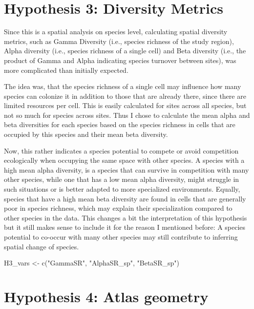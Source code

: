 \documentclass[
  letterpaper,
  DIV=11,
  numbers=noendperiod]{scrreprt}
\newenvironment{Shaded}{\begin{snugshade}}{\end{snugshade}}
\newcommand{\FunctionTok}[1]{\textcolor[rgb]{0.28,0.35,0.67}{#1}}
\newcommand{\NormalTok}[1]{\textcolor[rgb]{0.00,0.23,0.31}{#1}}
\newcommand{\OtherTok}[1]{\textcolor[rgb]{0.00,0.23,0.31}{#1}}
\newcommand{\StringTok}[1]{\textcolor[rgb]{0.13,0.47,0.30}{#1}}
\begin{document}
\section{Hypothesis 3: Diversity Metrics}

Since this is a spatial analysis on species level, calculating spatial
diversity metrics, such as Gamma Diversity (i.e., species richness of
the study region), Alpha diversity (i.e., species richness of a single
cell) and Beta diversity (i.e., the product of Gamma and Alpha
indicating species turnover between sites), was more complicated than
initially expected.

The idea was, that the species richness of a single cell may influence
how many species can colonize it in addition to those that are already
there, since there are limited resources per cell. This is easily
calculated for sites across all species, but not so much for species
across sites. Thus I chose to calculate the mean alpha and beta
diversities for each species based on the species richness in cells that
are occupied by this species and their mean beta diversity.

Now, this rather indicates a species potential to compete or avoid
competition ecologically when occupying the same space with other
species. A species with a high mean alpha diversity, is a species that
can survive in competition with many other species, while one that has a
low mean alpha diversity, might struggle in such situations or is better
adapted to more specialized environments. Equally, species that have a
high mean beta diversity are found in cells that are generally poor in
species richness, which may explain their specialization compared to
other species in the data. This changes a bit the interpretation of this
hypothesis but it still makes sense to include it for the reason I
mentioned before: A species potential to co-occur with many other
species may still contribute to inferring spatial change of species.

\begin{Shaded}
\begin{Highlighting}[]
\NormalTok{H3\_vars }\OtherTok{\textless{}{-}} \FunctionTok{c}\NormalTok{(}\StringTok{"GammaSR"}\NormalTok{, }\StringTok{"AlphaSR\_sp"}\NormalTok{, }\StringTok{"BetaSR\_sp"}\NormalTok{)}
\end{Highlighting}
\end{Shaded}

\section{Hypothesis 4: Atlas geometry}
\end{document}
